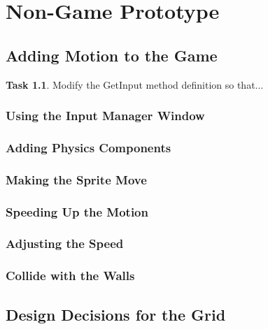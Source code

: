 \documentclass[12pt]{amsbook}
\theoremstyle{definition}
\newtheorem{task}[exercise]{Task}
\theoremstyle{remark}
\numberwithin{figure}{chapter}
\numberwithin{table}{chapter}
\numberwithin{section}{chapter}
\numberwithin{equation}{section}
\begin{document}
\chapter{Non-Game Prototype}

\section{Adding Motion to the Game}

\begin{task}
Modify the GetInput method definition so that...
\end{task}

\subsection{Using the Input Manager Window}

\subsection{Adding Physics Components}

\subsection{Making the Sprite Move}

\subsection{Speeding Up the Motion}

\subsection{Adjusting the Speed}


\subsection{Collide with the Walls}

\section{Design Decisions for the Grid}
\end{document}

